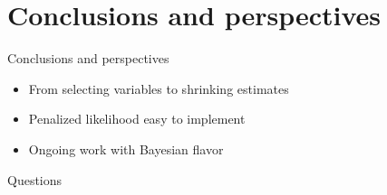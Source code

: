 \documentclass[14pt]{beamer}
\begin{document}
\section{Conclusions and perspectives}

\begin{frame}{Conclusions and perspectives}

\begin{itemize}
\item From selecting variables to \alert{shrinking} estimates
\item Penalized likelihood easy to implement
\item Ongoing work with Bayesian flavor
\end{itemize}

\end{frame}

\begin{frame}[standout]
  Questions
\end{frame}
\end{document}
